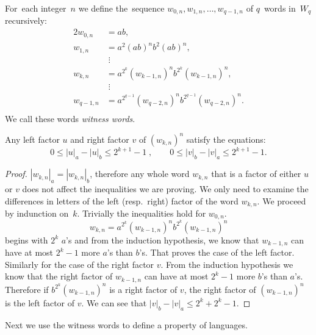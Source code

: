 \begin{defn}
    For~each integer~$n$ we define the~sequence $w_{0,n}, w_{1,n}, \dotsc , w_{q-1,n}$ of $q$~words in~$W_q$ recursively:
    \begin{alignat*}{2}
        w_{0,n} &= ab,\\
        w_{1,n} &= a^2{(ab)}^{n}b^2{(ab)}^{n},\\
                &\; \vdots \\
        w_{k,n} &= a^{2^k}{(w_{k-1,n})}^{n}b^{2^k}{(w_{k-1,n})}^{n},\\
                &\; \vdots \\
        w_{q-1,n} &= a^{2^{q-1}}{(w_{q-2,n})}^{n}b^{2^{q-1}}{(w_{q-2,n})}^{n}.\\
    \end{alignat*}
    We call these words \emph{witness words}.
\end{defn}

\begin{lemma}\label{lm:witness_words_inequalities}
    Any left factor $u$ and right factor $v$ of ${(w_{k,n})}^n$ satisfy the equations:
    \begin{equation}
        0 \leq |u|_a - |u|_b \leq 2^{k+1}-1 \; , \qquad 0 \leq |v|_b - |v|_a \leq 2^{k+1}-1.
    \end{equation}
\end{lemma}

\begin{proof}
    $|w_{k,n}|_a = |w_{k,n}|_b$, therefore any whole word $w_{k,n}$ that is a factor of either $u$ or $v$ does not affect the inequalities we are proving. We only need to examine the differences in letters of the left (resp.~right) factor of the word $w_{k,n}$. We proceed by indunction on~$k$. Trivially the inequalities hold for $w_{0,n}$.
    \[
        w_{k,n} = a^{2^k}{(w_{k-1,n})}^{n}b^{2^k}{(w_{k-1,n})}^{n}
    \] begins with $2^k$ $a$'s and from the induction hypothesis, we know that $w_{k-1,n}$ can have at most $2^k-1$ more $a$'s than $b$'s. That proves the case of the left factor.
    Similarly for the case of the right factor $v$. From the induction hypothesis we know that the right factor of $w_{k-1,n}$ can have at most $2^k-1$ more $b$'s than $a$'s. Therefore if $b^{2^k}{(w_{k-1,n})}^{n}$ is a right factor of $v$, the right factor of ${(w_{k-1,n})}^{n}$ is the left factor of $v$. We can see that $|v|_b - |v|_a \leq 2^k + 2^k -1$.
\end{proof}

Next we use the witness words to define a property of languages.

